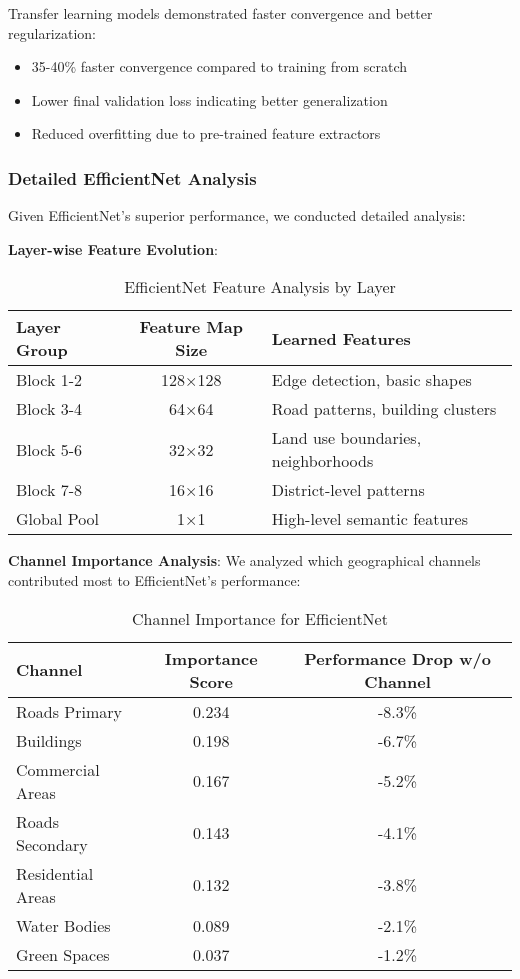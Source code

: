 Transfer learning models demonstrated faster convergence and better regularization:
\begin{itemize}
    \item 35-40\% faster convergence compared to training from scratch
    \item Lower final validation loss indicating better generalization
    \item Reduced overfitting due to pre-trained feature extractors
\end{itemize}

\subsubsection{Detailed EfficientNet Analysis}

Given EfficientNet's superior performance, we conducted detailed analysis:

\textbf{Layer-wise Feature Evolution}:
\begin{table}[H]
\centering
\caption{EfficientNet Feature Analysis by Layer}
\begin{tabular}{|l|c|l|}
\hline
\textbf{Layer Group} & \textbf{Feature Map Size} & \textbf{Learned Features} \\
\hline
Block 1-2 & 128×128 & Edge detection, basic shapes \\
Block 3-4 & 64×64 & Road patterns, building clusters \\
Block 5-6 & 32×32 & Land use boundaries, neighborhoods \\
Block 7-8 & 16×16 & District-level patterns \\
Global Pool & 1×1 & High-level semantic features \\
\hline
\end{tabular}
\end{table}

\textbf{Channel Importance Analysis}:
We analyzed which geographical channels contributed most to EfficientNet's performance:

\begin{table}[H]
\centering
\caption{Channel Importance for EfficientNet}
\begin{tabular}{|l|c|c|}
\hline
\textbf{Channel} & \textbf{Importance Score} & \textbf{Performance Drop w/o Channel} \\
\hline
Roads Primary & 0.234 & -8.3\% \\
Buildings & 0.198 & -6.7\% \\
Commercial Areas & 0.167 & -5.2\% \\
Roads Secondary & 0.143 & -4.1\% \\
Residential Areas & 0.132 & -3.8\% \\
Water Bodies & 0.089 & -2.1\% \\
Green Spaces & 0.037 & -1.2\% \\
\hline
\end{tabular}
\end{table}

